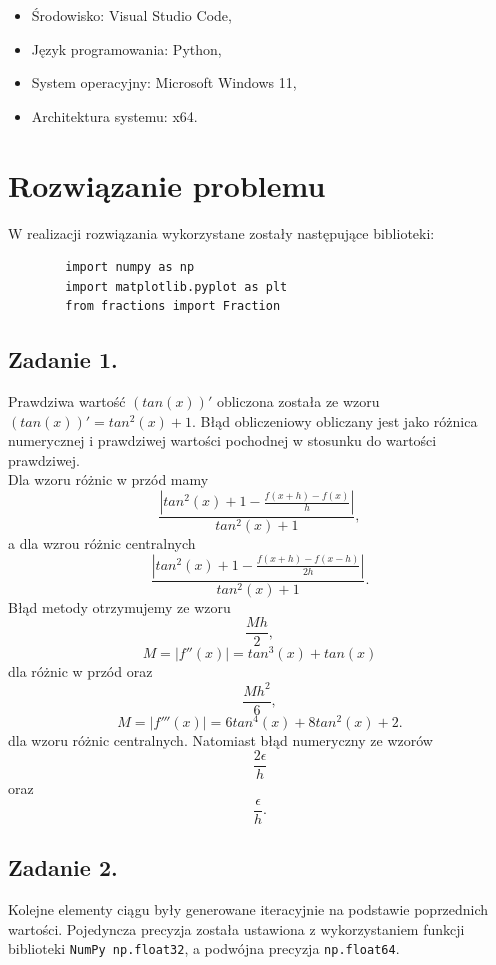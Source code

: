 \documentclass[11pt]{scrartcl}
\begin{document}
    \begin{itemize}
        \item Środowisko: Visual Studio Code,
        \item Język programowania: Python,
        \item System operacyjny: Microsoft Windows 11,
        \item Architektura systemu: x64.
    \end{itemize}
    
    \section{Rozwiązanie problemu}
    W realizacji rozwiązania wykorzystane zostały następujące biblioteki:
    \begin{lstlisting}
        import numpy as np
        import matplotlib.pyplot as plt
        from fractions import Fraction
    \end{lstlisting}

    \subsection{Zadanie 1.}
    Prawdziwa wartość $(tan(x))'$ obliczona została ze wzoru
    $(tan(x))'=tan^2(x)+1$. Błąd obliczeniowy obliczany jest jako różnica
    numerycznej i prawdziwej wartości pochodnej w stosunku do wartości
    prawdziwej. \\
    Dla wzoru różnic w przód mamy
    \[
        \frac{\left| tan^2(x)+1 - \frac{f(x+h) - f(x)}{h} \right|}{tan^2(x)+1},
    \]
    a dla wzrou różnic centralnych
    \[
        \frac{\left| tan^2(x)+1 - \frac{f(x+h) - f(x-h)}{2h} \right|}
        {tan^2(x)+1}.
    \]
    Błąd metody otrzymujemy ze wzoru
    \[
        \frac{Mh}{2},
    \]
    \[
        M=\left|f''(x)\right|=tan^3(x)+tan(x)
    \]
    dla różnic w przód oraz
    \[
        \frac{Mh^2}{6},
    \]
    \[
        M=\left|f'''(x)\right|=6tan^4(x)+8tan^2(x)+2.
    \]
    dla wzoru różnic centralnych. Natomiast błąd numeryczny ze wzorów
    \[
        \frac{2\epsilon}{h}
    \]
    oraz
    \[
        \frac{\epsilon}{h}.
    \]

    \subsection{Zadanie 2.}
    Kolejne elementy ciągu były generowane iteracyjnie na podstawie poprzednich
    wartości. Pojedyncza precyzja została ustawiona z wykorzystaniem funkcji
    biblioteki \texttt{NumPy np.float32}, a podwójna precyzja
    \texttt{np.float64}.
\end{document}

